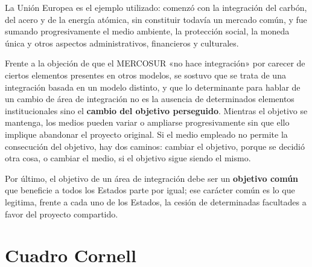 \documentclass[12pt,oneside]{book}
\newcommand{\cornellsection}{%
    \clearpage
    \section*{Cuadro Cornell}%
    \addcontentsline{toc}{section}{Cuadro Cornell}%
}
\begin{document}
La Unión Europea es el ejemplo utilizado: comenzó con la integración del carbón, del acero y de la energía atómica, sin constituir todavía un mercado común, y fue sumando progresivamente el medio ambiente, la protección social, la moneda única y otros aspectos administrativos, financieros y culturales.

Frente a la objeción de que el MERCOSUR «no hace integración» por carecer de ciertos elementos presentes en otros modelos, se sostuvo que se trata de una integración basada en un modelo distinto, y que lo determinante para hablar de un cambio de área de integración no es la ausencia de determinados elementos institucionales sino el \textbf{cambio del objetivo perseguido}. Mientras el objetivo se mantenga, los medios pueden variar o ampliarse progresivamente sin que ello implique abandonar el proyecto original. Si el medio empleado no permite la consecución del objetivo, hay dos caminos: cambiar el objetivo, porque se decidió otra cosa, o cambiar el medio, si el objetivo sigue siendo el mismo.

Por último, el objetivo de un área de integración debe ser un \textbf{objetivo común} que beneficie a todos los Estados parte por igual; ese carácter común es lo que legitima, frente a cada uno de los Estados, la cesión de determinadas facultades a favor del proyecto compartido.

\cornellsection
\end{document}
